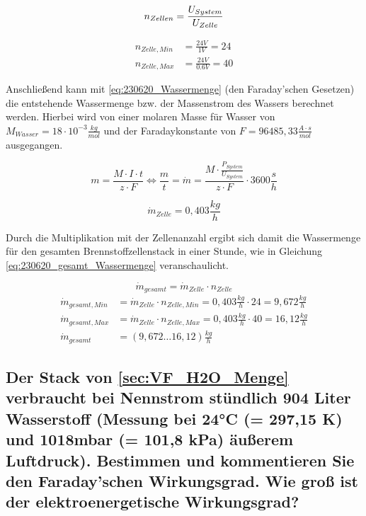 \begin{equation}
    n_{Zellen} = \frac{U_{System}}{U_{Zelle}}\\
    \label{eq:230620_n_Zelle}
\end{equation}

\begin{align}
    n_{Zelle,Min} &= \frac{24V}{1V} = 24 \nonumber\\
    n_{Zelle,Max} &= \frac{24V}{0.6V} = 40 \nonumber
\end{align}

Anschließend kann mit \autoref{eq:230620_Wassermenge} (den Faraday'schen Gesetzen) die entstehende Wassermenge bzw. der Massenstrom des Wassers berechnet werden.
Hierbei wird von einer molaren Masse für Wasser von $M_{Wasser} = 18 \cdot 10^{-3} \frac{kg}{mol}$ und der Faradaykonstante von $F =96485,33 \frac{A\cdot s}{mol}$ ausgegangen.

\begin{equation}
    m = \frac{M \cdot I \cdot t}{z \cdot F} \Leftrightarrow \frac{m}{t} = \dot{m} = \frac{M \cdot \frac{P_{System}}{U_{System}}}{z \cdot F} \cdot 3600 \frac{s}{h}
    \label{eq:230620_Wassermenge}
\end{equation}

$$\dot{m}_{Zelle} = 0,403 \frac{kg}{h}$$

Durch die Multiplikation mit der Zellenanzahl ergibt sich damit die Wassermenge für den gesamten Brennstoffzellenstack in einer Stunde, wie in Gleichung \autoref{eq:230620_gesamt_Wassermenge} veranschaulicht.

\begin{equation}
    \dot{m}_{gesamt} = \dot{m}_{Zelle} \cdot n_{Zelle}
    \label{eq:230620_gesamt_Wassermenge}
\end{equation}
\begin{align}
    \dot{m}_{gesamt,Min} &= \dot{m}_{Zelle} \cdot n_{Zelle,Min} = 0,403 \frac{kg}{h} \cdot 24 = 9,672 \frac{kg}{h} \nonumber\\
    \dot{m}_{gesamt,Max} &= \dot{m}_{Zelle} \cdot n_{Zelle,Max} = 0,403 \frac{kg}{h} \cdot 40 = 16,12 \frac{kg}{h} \nonumber\\
    \dot{m}_{gesamt} &= (9,672 \dots 16,12) \frac{kg}{h} \nonumber
\end{align}

\subsection{Der Stack von \ref{sec:VF_H2O_Menge} verbraucht bei Nennstrom stündlich 904 Liter Wasserstoff (Messung bei 24°C (= 297,15 K) und 1018mbar (= 101,8 kPa) äußerem Luftdruck). 
Bestimmen und kommentieren Sie den Faraday'schen Wirkungsgrad. Wie groß ist der elektroenergetische Wirkungsgrad?}

